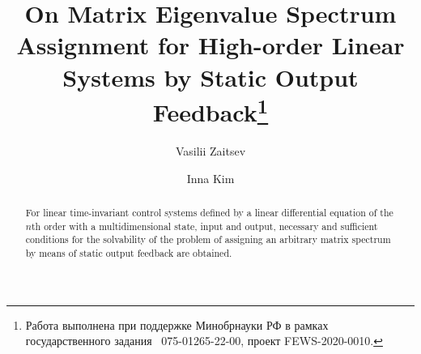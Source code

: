 \begin{englishtitle} %
\title{On Matrix Eigenvalue Spectrum Assignment for High-order Linear Systems by Static Output Feedback\thanks{Работа выполнена при поддержке Минобрнауки РФ в рамках государственного задания \textnumero~075-01265-22-00, проект FEWS-2020-0010.}}
\author{Vasilii Zaitsev 
  \and
  Inna Kim 
}

\maketitle

\begin{abstract}
For linear time-invariant control systems defined by a linear differential equation of the $n$th order with a multidimensional state, input and output, necessary and sufficient conditions for the solvability of the problem of assigning an arbitrary matrix spectrum by means of static output feedback are obtained.

\end{abstract}
\end{englishtitle}

\iffalse

%
%

